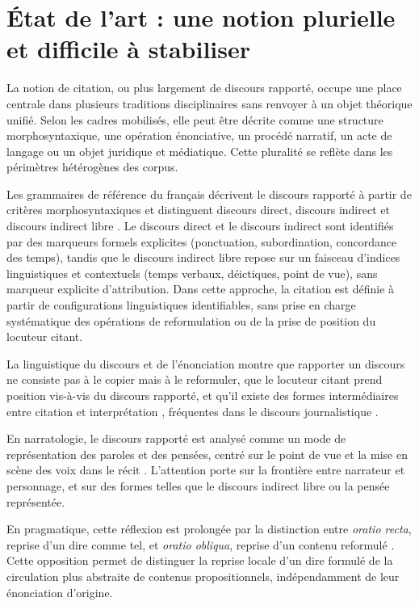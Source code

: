 \documentclass[final,fra]{anthology-ch}         %
\begin{document}
\section{État de l'art : une notion plurielle et difficile à stabiliser}

La notion de citation, ou plus largement de discours rapporté, occupe
une place centrale dans plusieurs traditions disciplinaires sans
renvoyer à un objet théorique unifié. Selon les cadres mobilisés, elle
peut être décrite comme une structure morphosyntaxique, une opération
énonciative, un procédé narratif, un acte de langage ou un objet
juridique et médiatique. Cette pluralité se reflète dans les périmètres
hétérogènes des corpus.

Les grammaires de référence du français décrivent le discours rapporté à
partir de critères morphosyntaxiques et distinguent discours direct,
discours indirect et discours indirect libre \cite{riegel1994grammaire,grevisse2016bon}. Le discours direct et le discours
indirect sont identifiés par des marqueurs formels explicites
(ponctuation, subordination, concordance des temps), tandis que le
discours indirect libre repose sur un faisceau d'indices linguistiques
et contextuels (temps verbaux, déictiques, point de vue), sans marqueur
explicite d'attribution. Dans cette approche, la citation est définie à
partir de configurations linguistiques identifiables, sans prise en
charge systématique des opérations de reformulation ou de la prise de
position du locuteur citant.

La linguistique du discours et de l'énonciation montre que rapporter un
discours ne consiste pas à le copier mais à le reformuler, que le
locuteur citant prend position vis-à-vis du discours rapporté, et qu'il
existe des formes intermédiaires entre citation et interprétation
\cite{bakhtine1977discours,authier1996ces}, fréquentes dans le discours
journalistique \cite{rosier1998discours}.

En narratologie, le discours rapporté est analysé comme un mode de
représentation des paroles et des pensées, centré sur le point de vue et
la mise en scène des voix dans le récit \cite{genette1972figures,genette1982palimpsestes,cohn1978transparent}. L'attention porte sur la frontière entre narrateur et personnage,
et sur des formes telles que le discours indirect libre ou la pensée
représentée.

En pragmatique, cette réflexion est prolongée par la distinction entre
\textit{oratio recta}, reprise d'un dire comme tel, et \textit{oratio obliqua}, reprise
d'un contenu reformulé \cite{austin1962how,searle1969speech,recanati2000oratio}.
Cette opposition permet de distinguer la reprise locale d'un dire
formulé de la circulation plus abstraite de contenus propositionnels,
indépendamment de leur énonciation d'origine.
\end{document}
